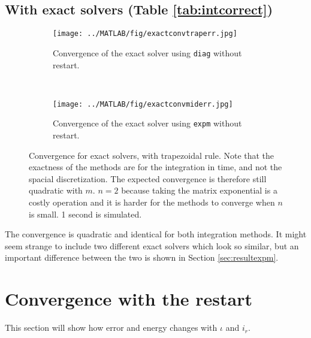 \subsection{With exact solvers (Table \ref{tab:intcorrect})} %
\label{sec:exactconv}
\begin{figure}[H]
        \centering
        \begin{subfigure}[b]{0.3\textwidth}
                \texttt{[image: ../MATLAB/fig/exactconvtraperr.jpg]}
                \caption{ Convergence of the exact solver using \texttt{diag} without restart. }
                \label{fig:exactconvtraperr}
        \end{subfigure}
        ~
        \begin{subfigure}[b]{0.3\textwidth}
                \texttt{[image: ../MATLAB/fig/exactconvmiderr.jpg]}
                \caption{ Convergence of the exact solver using \texttt{expm} without restart. }  
				\label{fig:exactconvmiderr}
        \end{subfigure}         
       
\caption{Convergence for exact solvers, with trapezoidal rule. Note that the exactness of the methods are for the integration in time, and not the spacial discretization. The expected convergence is therefore still quadratic with $m$. $n = 2$ because taking the matrix exponential is a costly operation and it is harder for the methods to converge when $n$ is small. 1 second is simulated. } %
\label{fig:intexactt}
\end{figure}
The convergence is quadratic and identical for both integration methods. It might seem strange to include two different exact solvers which look so similar, but an important difference between the two is shown in Section \ref{sec:resultexpm}.

\section{Convergence with the restart}%
This section will show how error and energy changes with $\iota$ and $i_r$.
